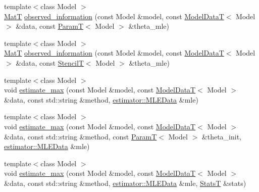 \begin{DoxyCompactItemize}
\item 
{\footnotesize template$<$class Model $>$ }\\\hyperlink{namespacemappel_a7091ab87c528041f7e2027195fad8915}{MatT} \hyperlink{namespacemappel_1_1methods_a1ba88d74149dc10c6a9d21bc7b98eb9c}{observed\+\_\+information} (const Model \&model, const \hyperlink{namespacemappel_a97f050df953605381ae9c901c3b125f1}{Model\+DataT}$<$ Model $>$ \&data, const \hyperlink{namespacemappel_a667925cb0d6c0e49f2f035cc5a9a6857}{ParamT}$<$ Model $>$ \&theta\+\_\+mle)
\item 
{\footnotesize template$<$class Model $>$ }\\\hyperlink{namespacemappel_a7091ab87c528041f7e2027195fad8915}{MatT} \hyperlink{namespacemappel_1_1methods_a31fff94b478f79915deac3441e9b1912}{observed\+\_\+information} (const Model \&model, const \hyperlink{namespacemappel_a97f050df953605381ae9c901c3b125f1}{Model\+DataT}$<$ Model $>$ \&data, const \hyperlink{namespacemappel_a3a06598240007876f8c4bf834ad86197}{StencilT}$<$ Model $>$ \&theta\+\_\+mle)
\item 
{\footnotesize template$<$class Model $>$ }\\void \hyperlink{namespacemappel_1_1methods_a42ac3ed9518c52751c2cc4e9fb7d5583}{estimate\+\_\+max} (const Model \&model, const \hyperlink{namespacemappel_a97f050df953605381ae9c901c3b125f1}{Model\+DataT}$<$ Model $>$ \&data, const std\+::string \&method, \hyperlink{namespacemappel_1_1estimator_structmappel_1_1estimator_1_1MLEData}{estimator\+::\+M\+L\+E\+Data} \&mle)
\item 
{\footnotesize template$<$class Model $>$ }\\void \hyperlink{namespacemappel_1_1methods_a693e37d08ec7691dea4017bcadc7e492}{estimate\+\_\+max} (const Model \&model, const \hyperlink{namespacemappel_a97f050df953605381ae9c901c3b125f1}{Model\+DataT}$<$ Model $>$ \&data, const std\+::string \&method, const \hyperlink{namespacemappel_a667925cb0d6c0e49f2f035cc5a9a6857}{ParamT}$<$ Model $>$ \&theta\+\_\+init, \hyperlink{namespacemappel_1_1estimator_structmappel_1_1estimator_1_1MLEData}{estimator\+::\+M\+L\+E\+Data} \&mle)
\item 
{\footnotesize template$<$class Model $>$ }\\void \hyperlink{namespacemappel_1_1methods_a850f8935e3a5aa15a2ff4b2300039ee6}{estimate\+\_\+max} (const Model \&model, const \hyperlink{namespacemappel_a97f050df953605381ae9c901c3b125f1}{Model\+DataT}$<$ Model $>$ \&data, const std\+::string \&method, \hyperlink{namespacemappel_1_1estimator_structmappel_1_1estimator_1_1MLEData}{estimator\+::\+M\+L\+E\+Data} \&mle, \hyperlink{namespacemappel_a04ab395b0cf82c4ce68a36b2212649a5}{StatsT} \&stats)

\end{DoxyCompactItemize}
